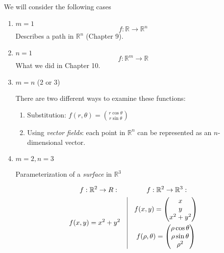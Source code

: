 \documentclass[00_complete]{subfiles}
\begin{document}
\begin{example} We will consider the following cases
    \begin{enumerate}
        \item $m=1$
            $$f: \mathbb{R} \to \mathbb{R}^n$$
        Describes a path in $\mathbb{R}^n$ (Chapter 9).
        \item $n=1$
            $$f: \mathbb{R}^m \to \mathbb{R}$$
        What we did in Chapter 10.
        \item $m=n$ ($2$ or $3$)

            There are two different ways to examine these functions:
            \begin{enumerate}
                \item Substitution: $f(r,\theta)=\binom{r\cos\theta}{r\sin\theta}$
                \item Using \emph{vector fields}: each point in
                    $\mathbb{R}^n$ can be represented as an $n$-dimensional
                    vector.
            \end{enumerate}
        \item $m=2,n=3$

        Parameterization of a \emph{surface} in $\mathbb{R}^3$
        \begin{example}
            \begin{gather*}
           f:\mathbb{R}^2\to R: \qquad\qquad f:\mathbb{R}^2\to \mathbb{R}^3: \\
            \begin{gathered}
                f(x,y)=x^2+y^2
            \end{gathered} \quad \vline \quad \begin{gathered}
                f(x,y)=\begin{pmatrix}
                    x\\y\\x^2+y^2
                \end{pmatrix} \\
                f(\rho,\theta) =\begin{pmatrix}
                    \rho\cos\theta\\\rho\sin\theta\\\rho^2
                \end{pmatrix}
            \end{gathered}
            \end{gather*}
        \end{example}
    \end{enumerate}
\end{example}
\end{document}
